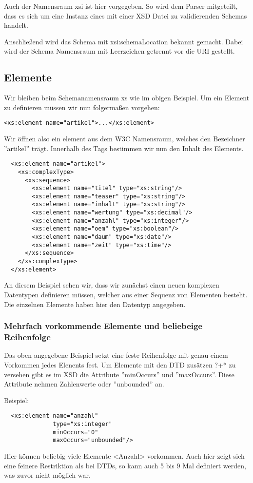 Auch der Namensraum xsi ist hier vorgegeben. So wird dem Parser mitgeteilt, dass es sich um eine Instanz eines mit einer
XSD Datei zu validierenden Schemas handelt.

Anschließend wird das Schema mit xsi:schemaLocation bekannt gemacht. Dabei wird der Schema Namensraum mit Leerzeichen
getrennt vor die URI gestellt.

\subsection{Elemente}
Wir bleiben beim Schemanamensraum xs wie im obigen Beispiel. Um ein Element zu definieren müssen wir nun folgermaßen
vorgehen:
\begin{verbatim}
<xs:element name="artikel">...</xs:element>
\end{verbatim}
Wir öffnen also ein element aus dem W3C Namensraum, welches den Bezeichner ''artikel'' trägt.
Innerhalb des Tags bestimmen wir nun den Inhalt des Elements.
\begin{verbatim}
  <xs:element name="artikel">
    <xs:complexType>
      <xs:sequence>
        <xs:element name="titel" type="xs:string"/>
        <xs:element name="teaser" type="xs:string"/>
        <xs:element name="inhalt" type="xs:string"/>
        <xs:element name="wertung" type="xs:decimal"/>
        <xs:element name="anzahl" type="xs:integer"/>
        <xs:element name="oem" type="xs:boolean"/>
        <xs:element name="daum" type="xs:date"/>
        <xs:element name="zeit" type="xs:time"/>
      </xs:sequence>
    </xs:complexType>
  </xs:element>
\end{verbatim}

An diesem Beispiel sehen wir, dass wir zunächst einen neuen komplexen Datentypen definieren müssen, welcher aus einer
Sequenz von Elementen besteht. Die einzelnen Elemente haben hier den Datentyp angegeben.

\subsubsection{Mehrfach vorkommende Elemente und beliebeige Reihenfolge}
Das oben angegebene Beispiel setzt eine feste Reihenfolge mit genau einem Vorkommen jedes Elenents fest.
Um Elemente mit den DTD zusätzen ?+* zu versehen gibt es im  XSD die Attribute ''minOccurs'' und ''maxOccurs''.
Diese Attribute nehmen Zahlenwerte oder ''unbounded'' an.

Beispiel:
\begin{verbatim}
  <xs:element name="anzahl" 
              type="xs:integer" 
              minOccurs="0" 
              maxOccurs="unbounded"/>
\end{verbatim}
Hier können beliebig viele Elemente <Anzahl> vorkommen. Auch hier zeigt sich eine feinere Restriktion als bei DTDs, so
kann auch 5 bis 9 Mal definiert werden, was zuvor nicht möglich war.

